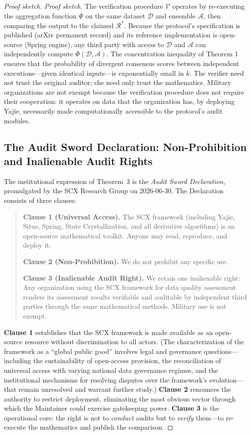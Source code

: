 \documentclass[12pt,a4paper]{ctexart}
\theoremstyle{definition}
\theoremstyle{remark}
\begin{document}
\begin{proof}[Proof sketch]
\textit{Proof sketch.} The verification procedure $\mathcal{V}$ operates by re-executing the aggregation function $\Phi$ on the same dataset $\mathcal{D}$ and ensemble $\mathcal{A}$, then comparing the output to the claimed $\mathcal{R}^*$. Because the protocol's specification is published (arXiv permanent record) and its reference implementation is open-source (Spring engine), any third party with access to $\mathcal{D}$ and $\mathcal{A}$ can independently compute $\Phi(\mathcal{D}, \mathcal{A})$. The concentration inequality of Theorem 1 ensures that the probability of divergent consensus scores between independent executions—given identical inputs—is exponentially small in $k$. The verifier need not trust the original auditor; she need only trust the mathematics. Military organizations are not exempt because the verification procedure does not require their cooperation: it operates on data that the organization has, by deploying Yajie, necessarily made computationally accessible to the protocol's audit modules.

\subsection{The Audit Sword Declaration: Non-Prohibition and Inalienable Audit Rights}

The institutional expression of Theorem~3 is the \textit{Audit Sword Declaration}, promulgated by the SCX Research Group on 2026-06-30. The Declaration consists of three clauses:

\begin{quote}
\textbf{Clause 1 (Universal Access).} The SCX framework (including Yajie, Situs, Spring, State Crystallization, and all derivative algorithms) is an open-source mathematical toolkit. Anyone may read, reproduce, and deploy it.

\textbf{Clause 2 (Non-Prohibition).} We do not prohibit any specific use.

\textbf{Clause 3 (Inalienable Audit Right).} We retain one inalienable right: Any organization using the SCX framework for data quality assessment renders its assessment results verifiable and auditable by independent third parties through the same mathematical methods. Military use is not exempt.
\end{quote}

\textbf{Clause 1} establishes that the SCX framework is made available as an open-source resource without discrimination to all actors. (The characterization of the framework as a ``global public good'' involves legal and governance questions—including the sustainability of open-access provision, the reconciliation of universal access with varying national data governance regimes, and the institutional mechanisms for resolving disputes over the framework's evolution—that remain unresolved and warrant further study.) \textbf{Clause 2} renounces the authority to restrict deployment, eliminating the most obvious vector through which the Maintainer could exercise gatekeeping power. \textbf{Clause 3} is the operational core: the right is not to \textit{conduct} audits but to \textit{verify} them—to re-execute the mathematics and publish the comparison.


\end{proof}
\end{document}
